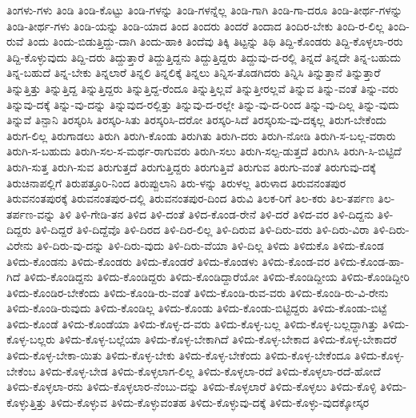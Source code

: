 {ತಿಂಗಳು-ಗಳು
ತಿಂಡಿ
ತಿಂಡಿ-ಕೊಟ್ಟು
ತಿಂಡಿ-ಗಳನ್ನು
ತಿಂಡಿ-ಗಳನ್ನೆಲ್ಲ
ತಿಂಡಿ-ಗಾಗಿ
ತಿಂಡಿ-ಗಾ-ದರೂ
ತಿಂಡಿ-ತೀರ್ಥ-ಗಳನ್ನು
ತಿಂಡಿ-ತೀರ್ಥ-ಗಳು
ತಿಂಡಿ-ಯನ್ನು
ತಿಂಡಿ-ಯಾದ
ತಿಂದ
ತಿಂದರು
ತಿಂದರೆ
ತಿಂದಾದ
ತಿಂದಿರ-ಬೇಕು
ತಿಂದಿ-ರ-ಲಿಲ್ಲ
ತಿಂದಿ-ರುವೆ
ತಿಂದು
ತಿಂದು-ಬಿಡುತ್ತಿದ್ದು-ದಾಗಿ
ತಿಂದು-ಹಾಕಿ
ತಿಂದೆವು
ತಿಕ್ಕಿ
ತಿಟ್ಟನ್ನು
ತಿಥಿ
ತಿದ್ದಿ-ಕೊಂಡರು
ತಿದ್ದಿ-ಕೊಳ್ಳಲಾ-ರರು
ತಿದ್ದಿ-ಕೊಳ್ಳುವುದು
ತಿದ್ದಿ-ದರು
ತಿದ್ದುತ್ತಾರೆ
ತಿದ್ದುತ್ತಿದ್ದನು
ತಿದ್ದುತ್ತಿದ್ದರು
ತಿದ್ದುವು-ದ-ರಲ್ಲಿ
ತಿನ್ನದೆ
ತಿನ್ನದೇ
ತಿನ್ನ-ಬಹುದು
ತಿನ್ನ-ಬಹುದೆ
ತಿನ್ನ-ಬೇಕು
ತಿನ್ನಲಾರೆ
ತಿನ್ನಲಿ
ತಿನ್ನಲಿಕ್ಕೆ
ತಿನ್ನಲು
ತಿನ್ನಿಸ-ತೊಡಗಿದರು
ತಿನ್ನಿಸಿ
ತಿನ್ನುತ್ತಾನೆ
ತಿನ್ನುತ್ತಾರೆ
ತಿನ್ನುತ್ತಿತ್ತು
ತಿನ್ನುತ್ತಿದ್ದ
ತಿನ್ನುತ್ತಿದ್ದರು
ತಿನ್ನುತ್ತಿದ್ದ-ರೆಂದೂ
ತಿನ್ನುತ್ತಿಲ್ಲವೆ
ತಿನ್ನುತ್ತೀರಲ್ಲವೆ
ತಿನ್ನುವ
ತಿನ್ನು-ವಂತೆ
ತಿನ್ನು-ವರು
ತಿನ್ನುವು-ದಕ್ಕೆ
ತಿನ್ನು-ವು-ದನ್ನು
ತಿನ್ನುವುದ-ರಲ್ಲಿತ್ತು
ತಿನ್ನುವು-ದ-ರಲ್ಲೇ
ತಿನ್ನು-ವು-ದ-ರಿಂದ
ತಿನ್ನು-ವು-ದಿಲ್ಲ
ತಿನ್ನು-ವುದು
ತಿನ್ನುವೆ
ತಿನ್ಪಾನಿ
ತಿರಸ್ಕರಿಸಿ
ತಿರಸ್ಕರಿ-ಸಿತು
ತಿರಸ್ಕರಿಸಿ-ದರೋ
ತಿರಸ್ಕರಿ-ಸಿದೆ
ತಿರಸ್ಕರಿಸು-ವು-ದಕ್ಕಲ್ಲ
ತಿರುಗ-ಬೇಕೆಂದು
ತಿರುಗ-ಲಿಲ್ಲ
ತಿರುಗಾಡಲು
ತಿರುಗಿ
ತಿರುಗಿ-ಕೊಂಡು
ತಿರುಗಿತು
ತಿರುಗಿ-ದರು
ತಿರುಗಿ-ನೋಡಿ
ತಿರುಗಿ-ಸ-ಬಲ್ಲ-ವರಾರು
ತಿರುಗಿ-ಸ-ಬಹುದು
ತಿರುಗಿ-ಸಲ-ಸ-ಮರ್ಥ-ರಾಗುವರು
ತಿರುಗಿ-ಸಲು
ತಿರುಗಿ-ಸಲ್ಪ-ಡುತ್ತದೆ
ತಿರುಗಿಸಿ
ತಿರುಗಿ-ಸಿ-ಬಿಟ್ಟಿದೆ
ತಿರುಗಿ-ಸುತ್ತ
ತಿರುಗಿ-ಸುವ
ತಿರುಗುತ್ತದೆ
ತಿರುಗುತ್ತಿದ್ದರು
ತಿರುಗುತ್ತಿವೆ
ತಿರುಗುವ
ತಿರುಗು-ವಂತೆ
ತಿರುಗುವು-ದಕ್ಕೆ
ತಿರುಚಿನಾಪಲ್ಲಿಗೆ
ತಿರುಪತ್ತೂರಿ-ನಿಂದ
ತಿರುಪ್ಪುಲಾನಿ
ತಿರು-ಳನ್ನು
ತಿರುಳಲ್ಲ
ತಿರುಳಾದ
ತಿರುವನಂತಪುರ
ತಿರುವನಂತಪುರಕ್ಕೆ
ತಿರುವನಂತಪುರ-ದಲ್ಲಿ
ತಿರುವನಂತಪುರ-ದಿಂದ
ತಿರುವಿ
ತಿಲಕ-ರಿಗೆ
ತಿಲ-ಕರು
ತಿಲ-ತರ್ಪಣ
ತಿಲ-ತರ್ಪಣ-ವನ್ನು
ತಿಳಿ
ತಿಳಿ-ಗೇಡಿ-ತನ
ತಿಳಿದ
ತಿಳಿ-ದಂತೆ
ತಿಳಿದ-ಕೊಂಡ-ರೇನೆ
ತಿಳಿ-ದರೆ
ತಿಳಿದ-ವರ
ತಿಳಿ-ದಿದ್ದನು
ತಿಳಿ-ದಿದ್ದರು
ತಿಳಿ-ದಿದ್ದರೆ
ತಿಳಿ-ದಿದ್ದೆವೊ
ತಿಳಿ-ದಿರದ
ತಿಳಿ-ದಿರ-ಲಿಲ್ಲ
ತಿಳಿ-ದಿರುವ
ತಿಳಿ-ದಿರು-ವರು
ತಿಳಿ-ದಿರು-ವಿರಾ
ತಿಳಿ-ದಿರು-ವಿರೇನು
ತಿಳಿ-ದಿರು-ವು-ದನ್ನು
ತಿಳಿ-ದಿರು-ವುದು
ತಿಳಿ-ದಿರು-ವೆಯಾ
ತಿಳಿ-ದಿಲ್ಲ
ತಿಳಿದು
ತಿಳಿದುಕೊ
ತಿಳಿದು-ಕೊಂಡ
ತಿಳಿದು-ಕೊಂಡನು
ತಿಳಿದು-ಕೊಂಡರು
ತಿಳಿದು-ಕೊಂಡರೆ
ತಿಳಿದು-ಕೊಂಡಳು
ತಿಳಿದು-ಕೊಂಡ-ವರ
ತಿಳಿದು-ಕೊಂಡ-ಹಾ-ಗಿದೆ
ತಿಳಿದು-ಕೊಂಡಿದ್ದನು
ತಿಳಿದು-ಕೊಂಡಿದ್ದರು
ತಿಳಿದು-ಕೊಂಡಿದ್ದಾರೆಯೋ
ತಿಳಿದು-ಕೊಂಡಿದ್ದೀಯ
ತಿಳಿದು-ಕೊಂಡಿದ್ದೀರಿ
ತಿಳಿದು-ಕೊಂಡಿರ-ಬೇಕೆಂದು
ತಿಳಿದು-ಕೊಂಡಿ-ರು-ವಂತೆ
ತಿಳಿದು-ಕೊಂಡಿ-ರುವ-ವರು
ತಿಳಿದು-ಕೊಂಡಿ-ರು-ವಿ-ರೇನು
ತಿಳಿದು-ಕೊಂಡಿ-ರುವುದು
ತಿಳಿದು-ಕೊಂಡಿಲ್ಲ
ತಿಳಿದು-ಕೊಂಡು
ತಿಳಿದು-ಕೊಂಡು-ಬಿಟ್ಟಿದ್ದರು
ತಿಳಿದು-ಕೊಂಡು-ಬಿಟ್ಟೆ
ತಿಳಿದು-ಕೊಂಡೆ
ತಿಳಿದು-ಕೊಂಡೆಯಾ
ತಿಳಿದು-ಕೊಳ್ಳ-ದ-ವರು
ತಿಳಿದು-ಕೊಳ್ಳ-ಬಲ್ಲ
ತಿಳಿದು-ಕೊಳ್ಳ-ಬಲ್ಲದ್ದಾಗಿತ್ತು
ತಿಳಿದು-ಕೊಳ್ಳ-ಬಲ್ಲರು
ತಿಳಿದು-ಕೊಳ್ಳ-ಬಲ್ಲೆಯಾ
ತಿಳಿದು-ಕೊಳ್ಳ-ಬೇಕಾಗಿದೆ
ತಿಳಿದು-ಕೊಳ್ಳ-ಬೇಕಾದ
ತಿಳಿದು-ಕೊಳ್ಳ-ಬೇಕಾದರೆ
ತಿಳಿದು-ಕೊಳ್ಳ-ಬೇಕಾ-ಯಿತು
ತಿಳಿದು-ಕೊಳ್ಳ-ಬೇಕು
ತಿಳಿದು-ಕೊಳ್ಳ-ಬೇಕೆಂದು
ತಿಳಿದು-ಕೊಳ್ಳ-ಬೇಕೆಂದೂ
ತಿಳಿದು-ಕೊಳ್ಳ-ಬೇಕೆಂಬ
ತಿಳಿದು-ಕೊಳ್ಳ-ಬೇಡ
ತಿಳಿದು-ಕೊಳ್ಳಲಾಗ-ಲಿಲ್ಲ
ತಿಳಿದು-ಕೊಳ್ಳಲಾ-ರದೆ
ತಿಳಿದು-ಕೊಳ್ಳಲಾ-ರದೆ-ಹೋದೆ
ತಿಳಿದು-ಕೊಳ್ಳಲಾ-ರನು
ತಿಳಿದು-ಕೊಳ್ಳಲಾರ-ನೆಂಬು-ದನ್ನು
ತಿಳಿದು-ಕೊಳ್ಳಲಾರೆ
ತಿಳಿದು-ಕೊಳ್ಳಲು
ತಿಳಿದು-ಕೊಳ್ಳಿ
ತಿಳಿದು-ಕೊಳ್ಳುತ್ತಿತ್ತು
ತಿಳಿದು-ಕೊಳ್ಳುವ
ತಿಳಿದು-ಕೊಳ್ಳುವಂತಹ
ತಿಳಿದು-ಕೊಳ್ಳುವು-ದಕ್ಕೆ
ತಿಳಿದು-ಕೊಳ್ಳು-ವುದಕ್ಕೋಸ್ಕರ
}
